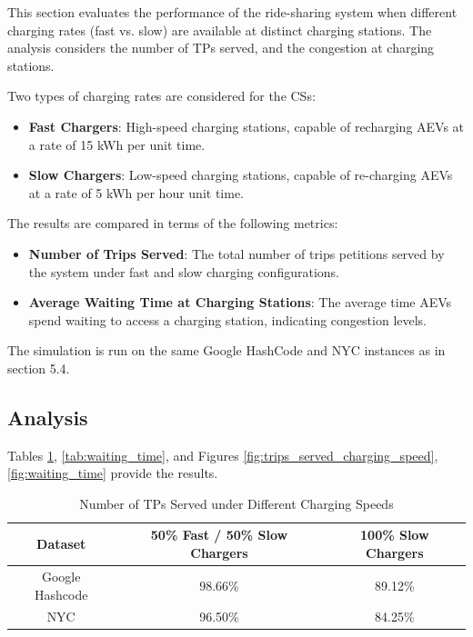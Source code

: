 This section evaluates the performance of the ride-sharing system when different charging rates (fast vs. slow) are available at distinct charging stations. The analysis considers the number of TPs served, and the congestion at charging stations. 

Two types of charging rates are considered for the CSs:
\begin{itemize}
    \item \textbf{Fast Chargers}: High-speed charging stations,  capable of recharging AEVs at a rate of 15 kWh per unit time.
    \item \textbf{Slow Chargers}: Low-speed charging stations, capable of re-charging AEVs at a rate of 5 kWh per hour unit time.
\end{itemize}

The results are compared in terms of the following metrics:
\begin{itemize}
    \item \textbf{Number of Trips Served}: The total number of trips petitions served by the system under fast and slow charging configurations.
    \item \textbf{Average Waiting Time at Charging Stations}: The average time AEVs spend waiting to access a charging station, indicating congestion levels.
\end{itemize}

The simulation is run on the same Google HashCode and NYC instances as in section 5.4.

\subsection{Analysis}
Tables \ref{tab:trips_served_charging_speed}, \ref{tab:waiting_time}, and Figures \ref{fig:trips_served_charging_speed},  \ref{fig:waiting_time} provide the results.

\begin{table}[h]
\caption{Number of TPs Served under Different Charging Speeds}
\centering
\begin{tabular}{|c|c|c|}
\hline
\textbf{Dataset} & \textbf{50\% Fast / 50\% Slow Chargers} & \textbf{100\% Slow Chargers} \\
\hline
Google Hashcode & 98.66\% & 89.12\% \\
NYC & 96.50\% & 84.25\% \\
\hline
\end{tabular}
\label{tab:trips_served_charging_speed}
\end{table}

